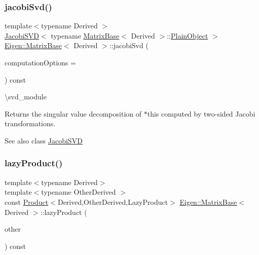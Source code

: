 \subsubsection{\texorpdfstring{jacobiSvd()}{jacobiSvd()}}
{\footnotesize\ttfamily template$<$typename Derived $>$ \\
\mbox{\hyperlink{class_eigen_1_1_jacobi_s_v_d}{Jacobi\+S\+VD}}$<$ typename \mbox{\hyperlink{class_eigen_1_1_matrix_base}{Matrix\+Base}}$<$ Derived $>$\+::\mbox{\hyperlink{class_eigen_1_1_dense_base_aae45af9b5aca5a9caae98fd201f47cc4}{Plain\+Object}} $>$ \mbox{\hyperlink{class_eigen_1_1_matrix_base}{Eigen\+::\+Matrix\+Base}}$<$ Derived $>$\+::jacobi\+Svd (\begin{DoxyParamCaption}\item[{unsigned int}]{computation\+Options = {} }\end{DoxyParamCaption}) const\hspace{0.3cm}{\ttfamily [inline]}}

\textbackslash{}svd\+\_\+module

\begin{DoxyReturn}{Returns}
the singular value decomposition of {\ttfamily $\ast$this} computed by two-\/sided Jacobi transformations.
\end{DoxyReturn}
\begin{DoxySeeAlso}{See also}
class \mbox{\hyperlink{class_eigen_1_1_jacobi_s_v_d}{Jacobi\+S\+VD}} 
\end{DoxySeeAlso}
\mbox{\label{class_eigen_1_1_matrix_base_ae2618c462dfbfc952aeaf090bd3722cd}} 
\subsubsection{\texorpdfstring{lazyProduct()}{lazyProduct()}}
{\footnotesize\ttfamily template$<$typename Derived$>$ \\
template$<$typename Other\+Derived $>$ \\
const \mbox{\hyperlink{class_eigen_1_1_product}{Product}}$<$Derived,Other\+Derived,Lazy\+Product$>$ \mbox{\hyperlink{class_eigen_1_1_matrix_base}{Eigen\+::\+Matrix\+Base}}$<$ Derived $>$\+::lazy\+Product (\begin{DoxyParamCaption}\item[{const \mbox{\hyperlink{class_eigen_1_1_matrix_base}{Matrix\+Base}}$<$ Other\+Derived $>$ \&}]{other }\end{DoxyParamCaption}) const}

